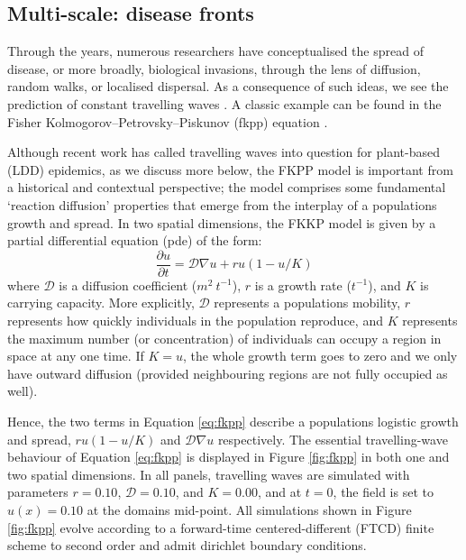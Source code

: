 \subsection{Multi-scale: disease fronts}

Through the years, numerous researchers have conceptualised the spread of disease, or more broadly, biological invasions, 
through the lens of diffusion, random walks, or localised dispersal. As a consequence of such ideas, we see the prediction
of constant travelling waves \cite{skellam1951random, mollison1977spatial, GRASSBERGER1983157, ferrandino1993dispersive}.
A classic example can be found in the Fisher Kolmogorov–Petrovsky–Piskunov (\acrshort{fkpp}) equation \cite{fisher1937wave}.

Although recent work has called travelling waves into question for plant-based (LDD) epidemics, as we discuss more below, 
the FKPP model is important from a historical and contextual perspective;
the model comprises some fundamental `reaction diffusion' properties that emerge from the interplay of a populations growth and spread.
In two spatial dimensions, the FKKP model is given by a partial differential equation (\acrshort{pde}) of the form:
\begin{equation}
\label{eq:fkpp}
    \frac{\partial u}{\partial t} = \mathcal{D}\nabla u + ru(1 - u/K)
\end{equation}
where $\mathcal{D}$ is a diffusion coefficient ($m^2\ t^{-1}$), $r$ is a growth rate ($t^{-1}$),
and $K$ is carrying capacity. More explicitly, $\mathcal{D}$ represents a populations mobility, 
$r$ represents how quickly individuals in the population reproduce, and $K$ represents 
the maximum number (or concentration) of individuals can occupy a region in space at any one time.
If $K=u$, the whole growth term goes to zero and we only have outward diffusion (provided neighbouring
regions are not fully occupied as well). 

Hence, the two terms in Equation \ref{eq:fkpp} describe a populations logistic growth and spread, $ru(1 - u/K)$ and $\mathcal{D}\nabla u$ respectively.
The essential travelling-wave behaviour of Equation \ref{eq:fkpp} is displayed in Figure \ref{fig:fkpp} 
in both one and two spatial dimensions. In all panels, travelling waves are simulated 
with parameters $r=0.10$, $\mathcal{D}=0.10$, and $K=0.00$, and at $t=0$, the field is set to $u(x)=0.10$ at the domains mid-point.
All simulations shown in Figure \ref{fig:fkpp} evolve according to a forward-time centered-different (FTCD) finite scheme to second order and admit dirichlet boundary conditions.

